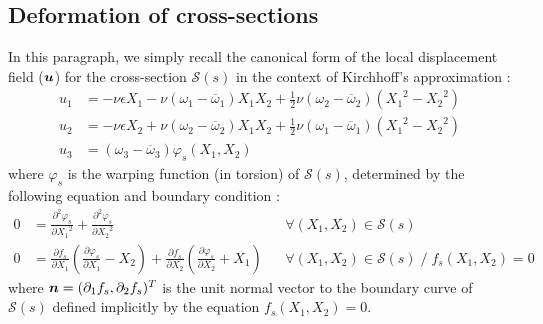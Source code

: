 \subsection{Deformation of cross-sections}
In this paragraph, we simply recall the canonical form of the local displacement field ($\boldsymbol{u}$) for the cross-section $\mathcal{S}(s)$ in the context of Kirchhoff's approximation : 
\begin{subequations}
	\begin{alignat}{1}
	u_1 &=
	-\nu \epsilon X_1 
	- \nu(\omega_1 - \overbar{\omega}_1) X_1 X_2
	+ \tfrac{1}{2}\nu(\omega_2 - \overbar{\omega}_2)({X_1}^2 - {X_2}^2)
	\\[0.5em]
	u_2 &= 
	-\nu \epsilon X_2 
	+ \nu(\omega_2 - \overbar{\omega}_2) X_1 X_2
	+ \tfrac{1}{2}\nu(\omega_1 - \overbar{\omega}_1)({X_1}^2 - {X_2}^2)
	\\[0.5em]
	u_3 &= (\omega_3 - \overbar{\omega}_3)\varphi_s(X_1,X_2)
	\end{alignat}
\end{subequations}
where $\varphi_s$ is the warping function (in torsion) of $\mathcal{S}(s)$, determined by the following equation and boundary condition :
\begin{subequations}
	\begin{alignat}{2}
	0 &= \frac{\partial^2 \varphi_s}{\partial {X_1}^2} + \frac{\partial^2 \varphi_s}{\partial {X_2}^2}
	&& \forall (X_1,X_2)\in\mathcal{S}(s)
	\\[0.5em]
	0 &= \frac{\partial f_s}{\partial {X_1}}\left(\frac{\partial \varphi_s}{\partial {X_1}} - X_2 \right) 
	+ \frac{\partial f_s}{\partial {X_2}}\left(\frac{\partial \varphi_s}{\partial {X_2}} + X_1 \right)
	&& \forall (X_1,X_2)\in\mathcal{S}(s)\; / \; f_s(X_1,X_2) = 0
	\end{alignat}
\end{subequations}
where $\boldsymbol{n} = (\partial_{1}f_s, \partial_{2}f_s)^T$ is the unit normal vector to the boundary curve of $\mathcal{S}(s)$ defined implicitly by the equation $f_s(X_1,X_2)=0$.


